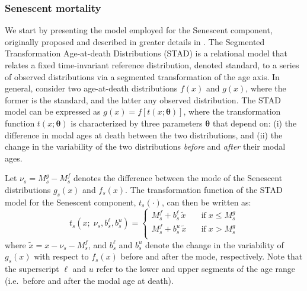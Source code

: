 \documentclass[11pt, a4paper]{article}
\begin{document}
\subsubsection{Senescent mortality}
We start by presenting the model employed for the Senescent component, originally proposed and described in greater details in \cite{basellini2019stad}.
The Segmented Transformation Age-at-death Distributions (STAD) is a relational model that relates a fixed time-invariant reference distribution, denoted standard, to a series of observed distributions via a segmented transformation of the age axis. In general, consider two age-at-death distributions $f(x)$ and $g(x)$, where the former is the standard, and the latter any observed distribution. The STAD model can be expressed as $g(x) = f\left[t(x;\bm{\theta})\right]$, where the transformation function $t(x;\bm{\theta})$ is characterized by three parameters $\bm{\theta}$ that depend on: (i) the difference in modal ages at death between the two distributions, and (ii) the change in the variability of the two distributions  \textit{before} and \textit{after} their modal ages. 

Let $\nu_{s} = M_{s}^{g} - M_{s}^{f}$ denotes the difference between the mode of the Senescent distributions $g_{s}(x)$ and $f_{s}(x)$. The transformation function of the STAD model for the Senescent component, $t_{s}(\cdot)$, can then be written as: 
%
\begin{equation}\label{Eq:STADsen}
	t_{s}(x;\;\nu_{s},b_{s}^{\ell},b_{s}^{u}) = \left\{ \begin{array}{ll}
		M_{s}^{f} + b_{s}^{\ell} \, \tilde{x} \quad & \mathrm{if} \; x \leq M_{s}^{g} \\
		M_{s}^{f} + b_{s}^{u} \, \tilde{x} \quad & \mathrm{if} \; x >  M_{s}^{g} \\
	\end{array}
	\right.
\end{equation}
%
where $\tilde{x} = x - \nu_{s} - M_{s}^{f}$, and $b_{s}^{\ell}$ and $b_{s}^{u}$ denote the change in the variability of $g_{s}(x)$ with respect to $f_{s}(x)$ before and after the mode, respectively. Note that the superscript $\ell$ and $u$ refer to the lower and upper segments of the age range (i.e.~before and after the modal age at death). 
\end{document}
